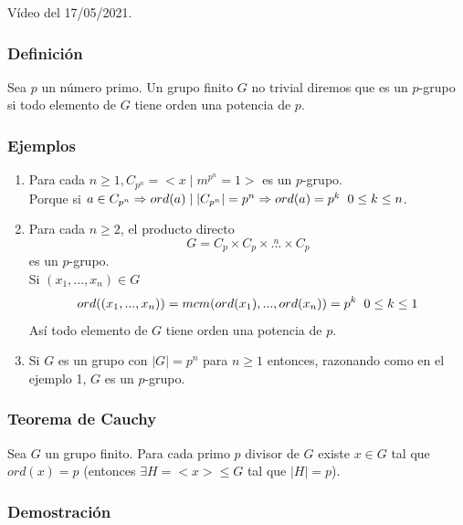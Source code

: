 \documentclass[11pt,a4paper]{article}
\begin{document}
Vídeo del 17/05/2021.

\subsubsection*{Definición}

Sea $p$ un número primo. Un grupo finito $G$ no trivial diremos que es un $p$-grupo si todo elemento de $G$ tiene orden una potencia de $p$.

\subsubsection*{Ejemplos}

\begin{enumerate}[label = \arabic*)]
\item Para cada $n \geq 1, C_{p^{n}} = <x \mid m^{p^{n}} = 1>$ es un $p$-grupo. \\
Porque si $a \in C_{p^{n}} \Rightarrow ord(a) \mid |C_{p^{n}}| = p^{n} \Rightarrow ord(a) = p^{k} \hspace{0.2cm} 0 \leq k \leq n$.
\item Para cada $n \geq 2$, el producto directo
$$G = C_{p} \times C_{p} \times \overset{n}{...} \times C_{p}$$
es un $p$-grupo. \\
Si $(x_{1}, ..., x_{n}) \in G$
$$ord((x_{1}, ..., x_{n})) = mcm(ord(x_{1}), ..., ord(x_{n})) = p^{k} \hspace{0.2cm} 0 \leq k \leq 1$$
Así todo elemento de $G$ tiene orden una potencia de $p$.
\item Si $G$ es un grupo con $|G| = p^{n}$ para $n \geq 1$ entonces, razonando como en el ejemplo 1, $G$ es un $p$-grupo.
\end{enumerate}

\subsubsection*{Teorema de Cauchy}

Sea $G$ un grupo finito. Para cada primo $p$ divisor de $G$ existe $x \in G$ tal que $ord(x) = p$ (entonces $\exists H = <x> \leqslant G$ tal que $|H| = p$).

\subsubsection*{Demostración}
\end{document}
